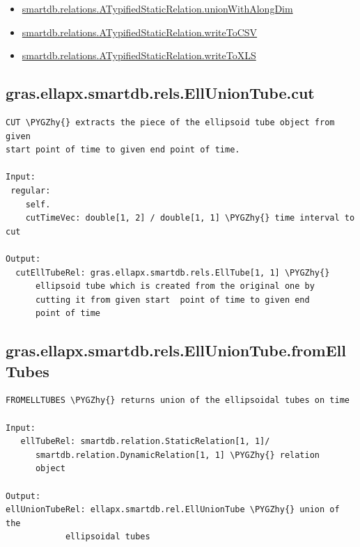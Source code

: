 \documentclass[letterpaper,10pt,english]{sphinxmanual}
\def\PYGZhy{\char`\-}
\begin{document}
\begin{itemize}
\item {} 
{\hyperref[chap_functions:smartdb-relations-atypifiedstaticrelation-unionwithalongdim]{smartdb.relations.ATypifiedStaticRelation.unionWithAlongDim}}

\item {} 
{\hyperref[chap_functions:smartdb-relations-atypifiedstaticrelation-writetocsv]{smartdb.relations.ATypifiedStaticRelation.writeToCSV}}

\item {} 
{\hyperref[chap_functions:smartdb-relations-atypifiedstaticrelation-writetoxls]{smartdb.relations.ATypifiedStaticRelation.writeToXLS}}

\end{itemize}


\subsection{gras.ellapx.smartdb.rels.EllUnionTube.cut}
\label{chap_functions:gras-ellapx-smartdb-rels-elluniontube-cut}
\begin{Verbatim}[commandchars=\\\{\}]
CUT \PYGZhy{} extracts the piece of the ellipsoid tube object from given
start point of time to given end point of time.

Input:
 regular:
    self.
    cutTimeVec: double[1, 2] / double[1, 1] \PYGZhy{} time interval to cut

Output:
  cutEllTubeRel: gras.ellapx.smartdb.rels.EllTube[1, 1] \PYGZhy{}
      ellipsoid tube which is created from the original one by
      cutting it from given start  point of time to given end
      point of time
\end{Verbatim}


\subsection{gras.ellapx.smartdb.rels.EllUnionTube.fromEllTubes}
\label{chap_functions:gras-ellapx-smartdb-rels-elluniontube-fromelltubes}
\begin{Verbatim}[commandchars=\\\{\}]
FROMELLTUBES \PYGZhy{} returns union of the ellipsoidal tubes on time

Input:
   ellTubeRel: smartdb.relation.StaticRelation[1, 1]/
      smartdb.relation.DynamicRelation[1, 1] \PYGZhy{} relation
      object

Output:
ellUnionTubeRel: ellapx.smartdb.rel.EllUnionTube \PYGZhy{} union of the
            ellipsoidal tubes
\end{Verbatim}
\end{document}
